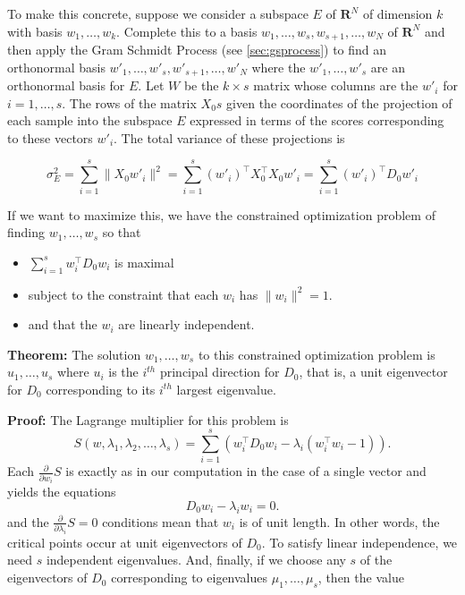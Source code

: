 \documentclass[
]{article}
\providecommand{\tightlist}{%
  \setlength{\itemsep}{0pt}\setlength{\parskip}{0pt}}
\begin{document}
To make this concrete, suppose we consider a subspace \(E\) of
\(\mathbf{R}^{N}\) of dimension \(k\) with basis
\(w_{1},\ldots, w_{k}\). Complete this to a basis
\(w_{1},\ldots, w_{s},w_{s+1},\ldots, w_{N}\) of \(\mathbf{R}^{N}\) and
then apply the Gram Schmidt Process (see \cref{sec:gsprocess}) to find
an orthonormal basis \(w'_{1},\ldots,w'_{s},w'_{s+1},\ldots, w'_{N}\)
where the \(w'_{1},\ldots, w'_{s}\) are an orthonormal basis for \(E\).
Let \(W\) be the \(k\times s\) matrix whose columns are the \(w'_{i}\)
for \(i=1,\ldots,s\). The rows of the matrix \(X_{0}s\) given the
coordinates of the projection of each sample into the subspace \(E\)
expressed in terms of the scores corresponding to these vectors
\(w'_{i}\). The total variance of these projections is

\[
\sigma_{E}^2 = \sum_{i=1}^{s} \|X_{0}w'_{i}\|^2 = \sum_{i=1}^{s} (w'_{i})^{\intercal}X_{0}^{\intercal}X_{0}w'_{i}  = \sum_{i=1}^{s} (w'_{i})^{\intercal}D_{0}w'_{i}
\]

If we want to maximize this, we have the constrained optimization
problem of finding \(w_{1},\ldots, w_{s}\) so that

\begin{itemize}
\tightlist
\item
  \(\sum_{i=1}^{s} w_{i}^{\intercal}D_{0}w_{i}\) is maximal
\item
  subject to the constraint that each \(w_{i}\) has \(\|w_{i}\|^2=1\).
\item
  and that the \(w_{i}\) are linearly independent.
\end{itemize}

\textbf{Theorem:} The solution \(w_{1},\ldots, w_{s}\) to this
constrained optimization problem is \(u_{1},\ldots, u_{s}\) where
\(u_{i}\) is the \(i^{th}\) principal direction for \(D_{0}\), that is,
a unit eigenvector for \(D_{0}\) corresponding to its \(i^{th}\) largest
eigenvalue.

\textbf{Proof:} The Lagrange multiplier for this problem is \[
S(w,\lambda_{1},\lambda_{2},\ldots, \lambda_{s}) = \sum_{i=1}^{s} (w_{i}^{\intercal}D_{0}w_{i} -\lambda_{i}(w_{i}^{\intercal}w_{i}-1)).
\] Each \(\frac{\partial}{\partial w_{i}} S\) is exactly as in our
computation in the case of a single vector and yields the equations \[
D_{0}w_{i}-\lambda_{i}w_{i}=0.
\] and the \(\frac{\partial}{\partial \lambda_{i}} S=0\) conditions mean
that \(w_{i}\) is of unit length. In other words, the critical points
occur at unit eigenvectors of \(D_{0}\). To satisfy linear independence,
we need \(s\) independent eigenvalues. And, finally, if we choose any
\(s\) of the eigenvectors of \(D_{0}\) corresponding to eigenvalues
\(\mu_{1},\ldots,\mu_{s}\), then the value
\end{document}

